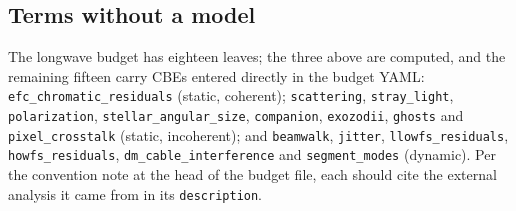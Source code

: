 \subsection{Terms without a model}

The longwave budget has eighteen leaves; the three above are computed, and the
remaining fifteen carry CBEs entered directly in the budget YAML:
\texttt{efc\_chromatic\_residuals} (static, coherent);
\texttt{scattering}, \texttt{stray\_light}, \texttt{polarization},
\texttt{stellar\_angular\_size}, \texttt{companion}, \texttt{exozodii},
\texttt{ghosts} and \texttt{pixel\_crosstalk} (static, incoherent); and
\texttt{beamwalk}, \texttt{jitter}, \texttt{llowfs\_residuals},
\texttt{howfs\_residuals}, \texttt{dm\_cable\_interference} and
\texttt{segment\_modes} (dynamic). Per the convention note at the head of the
budget file, each should cite the external analysis it came from in its
\texttt{description}.
